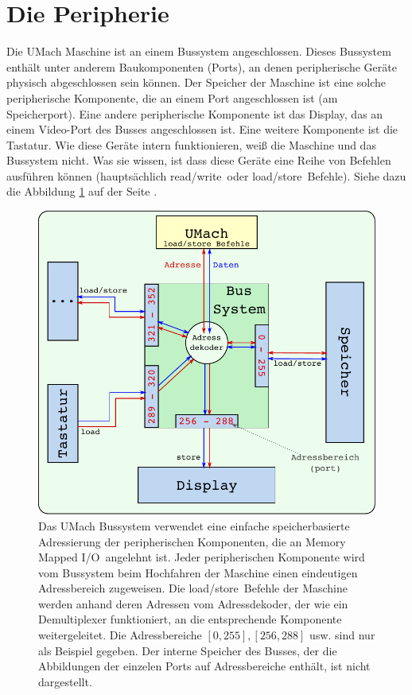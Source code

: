 \section{Die Peripherie}
Die UMach Maschine ist an einem \gls{Bussystem} angeschlossen.
Dieses Bussystem enthält unter anderem Baukomponenten (Ports), an denen
peripherische Geräte physisch abgeschlossen sein können. Der
\gls{Speicher} der Maschine ist eine solche peripherische
Komponente, die an einem Port angeschlossen ist (am
Speicherport). Eine andere peripherische Komponente ist das
Display, das an einem Video-Port des Busses angeschlossen ist. Eine weitere
Komponente ist die Tastatur. Wie diese Geräte intern funktionieren, weiß die
Maschine und das Bussystem nicht. Was sie \glqq wissen\grqq, ist dass diese
Geräte eine Reihe von Befehlen ausführen können (hauptsächlich \glqq
read/write\grqq\ oder \glqq load/store\grqq\ Befehle). Siehe dazu die Abbildung
\ref{fig:UMach-Bussystem} auf der Seite \pageref{fig:UMach-Bussystem}.

\begin{figure}
  \centering
  \includegraphics{img/UMach-Bus}
  \caption[Das UMach Bussystem]
          {Das UMach Bussystem verwendet eine einfache speicherbasierte
          Adressierung der peripherischen Komponenten, die an
          \glqq Memory Mapped I/O\grqq\ angelehnt ist. Jeder peripherischen
          Komponente wird vom Bussystem beim Hochfahren der Maschine einen
          eindeutigen Adressbereich zugeweisen.
          Die \glqq load/store\grqq\ Befehle der Maschine werden anhand deren
          Adressen vom Adressdekoder, der wie ein Demultiplexer funktioniert,
          an die entsprechende Komponente weitergeleitet. Die
          Adressbereiche $[0,255], [256,288]$ usw. sind nur als
          Beispiel gegeben. Der interne Speicher des Busses, der die
          Abbildungen der einzelen Ports auf Adressbereiche enthält, ist nicht
          dargestellt.}
  \label{fig:UMach-Bussystem}
\end{figure}



